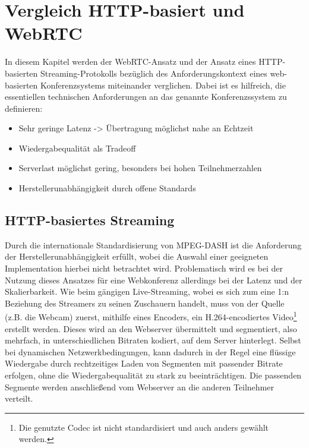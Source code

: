 \section{Vergleich HTTP-basiert und WebRTC}
\label{sec:Vergleich HTTP-basiert und WebRTC}
In diesem Kapitel werden der WebRTC-Ansatz und der Ansatz eines HTTP-basierten Streaming-Protokolls
bezüglich des Anforderungskontext eines web-basierten Konferenzsystems miteinander verglichen.
Dabei ist es hilfreich, die essentiellen technischen Anforderungen an das genannte Konferenzssystem zu definieren:
\begin{itemize}
    \item Sehr geringe Latenz -> Übertragung möglichst nahe an Echtzeit
    \item Wiedergabequalität als Tradeoff
    \item Serverlast möglichst gering, besonders bei hohen Teilnehmerzahlen
    \item Herstellerunabhängigkeit durch offene Standards
\end{itemize}

\subsection{HTTP-basiertes Streaming}
\label{subsec:vglHttpBasiertesStreaming}
Durch die internationale Standardisierung von MPEG-DASH ist die Anforderung der Herstellerunabhängigkeit erfüllt, wobei
die Auswahl einer geeigneten Implementation hierbei nicht betrachtet wird.
Problematisch wird es bei der Nutzung dieses Ansatzes für eine Webkonferenz allerdings bei der Latenz und der Skalierbarkeit.
Wie beim gängigen Live-Streaming, wobei es sich zum eine 1:n Beziehung des Streamers zu seinen Zuschauern handelt, muss von der Quelle (z.B. die Webcam)
zuerst, mithilfe eines Encoders, ein H.264-encodiertes Video\footnote{Die genutzte Codec ist nicht standardisiert und auch anders gewählt werden.}
erstellt werden.
Dieses wird an den Webserver übermittelt und segmentiert, also mehrfach, in unterschiedlichen Bitraten kodiert, auf dem Server hinterlegt.
Selbst bei dynamischen Netzwerkbedingungen, kann dadurch in der Regel eine flüssige Wiedergabe durch rechtzeitiges Laden von
Segmenten mit passender Bitrate erfolgen, ohne die Wiedergabequalität zu stark zu beeinträchtigen.
Die passenden Segmente werden anschließend vom Webserver an die anderen Teilnehmer verteilt.

